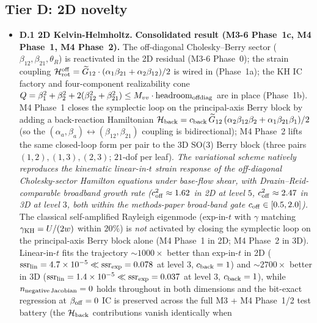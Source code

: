 \documentclass[11pt]{article}
\begin{document}
\subsection{Tier D: 2D novelty}
\label{sec:tier-D}

\begin{itemize}
\item \textbf{D.1 2D Kelvin-Helmholtz.}
\textbf{Consolidated result (M3-6 Phase~1c, M4 Phase~1, M4 Phase~2).}
The off-diagonal Cholesky--Berry sector
($\beta_{12}, \beta_{21}, \theta_R$) is reactivated in the 2D residual
(M3-6 Phase~0); the strain coupling
$\mathcal H_{\rm rot}^{\rm off} = \widetilde G_{12}\cdot
(\alpha_1\beta_{21} + \alpha_2\beta_{12})/2$ is wired in (Phase~1a);
the KH IC factory and four-component realizability cone
$Q = \beta_1^2 + \beta_2^2 + 2(\beta_{12}^2 + \beta_{21}^2) \le M_{vv}
\cdot \mathrm{headroom}_{\rm offdiag}$ are in place (Phase~1b). M4
Phase~1 closes the symplectic loop on the principal-axis Berry block by
adding a back-reaction Hamiltonian $\mathcal H_{\rm back} = c_{\rm
back}\,\widetilde G_{12}\,(\alpha_2\beta_{12}\beta_2 +
\alpha_1\beta_{21}\beta_1)/2$ (so the
$(\alpha_a, \beta_a) \leftrightarrow (\beta_{12}, \beta_{21})$ coupling
is bidirectional); M4 Phase~2 lifts the same closed-loop form per pair
to the 3D SO(3) Berry block (three pairs $(1,2), (1,3), (2,3)$;
$21$-dof per leaf). \emph{The variational scheme natively reproduces
the kinematic linear-in-$t$ strain response of the off-diagonal
Cholesky-sector Hamilton equations under base-flow shear, with
Drazin--Reid-comparable broadband growth rate
($c_{\rm off}^2 \approx 1.62$ in 2D at level $5$,
$c_{\rm off}^2 \approx 2.47$ in 3D at level $3$, both within the
methods-paper broad-band gate $c_{\rm off} \in [0.5, 2.0]$).} The
classical self-amplified Rayleigh eigenmode (exp-in-$t$ with $\gamma$
matching $\gamma_{\rm KH} = U/(2w)$ within $20\%$) is \emph{not}
activated by closing the symplectic loop on the principal-axis Berry
block alone (M4 Phase~1 in 2D; M4 Phase~2 in 3D). Linear-in-$t$ fits
the trajectory $\sim 1000\times$ better than exp-in-$t$ in 2D
($\mathrm{ssr}_{\rm lin} = 4.7\times 10^{-5} \ll \mathrm{ssr}_{\rm
exp} = 0.078$ at level $3$, $c_{\rm back} = 1$) and $\sim 2700\times$
better in 3D ($\mathrm{ssr}_{\rm lin} = 1.4\times 10^{-5} \ll
\mathrm{ssr}_{\rm exp} = 0.037$ at level $3$, $c_{\rm back} = 1$),
while $n_{\rm negative\,Jacobian} = 0$ holds throughout in both
dimensions and the bit-exact regression at $\beta_{\rm off} = 0$ IC
is preserved across the full M3 + M4 Phase~1/2 test battery (the
$\mathcal H_{\rm back}$ contributions vanish identically when

\end{itemize}
\end{document}
